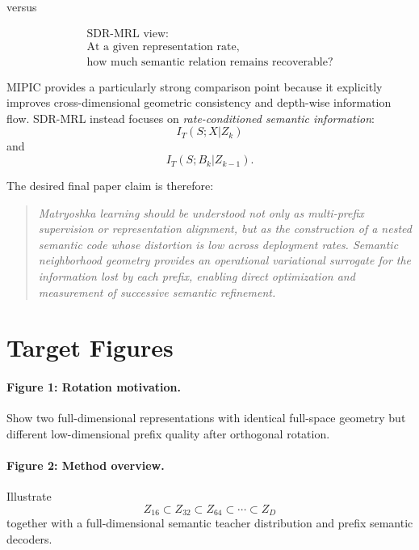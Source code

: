 \documentclass[11pt]{article}
\begin{document}
versus

\begin{equation}
\boxed{
\begin{array}{c}
\text{SDR-MRL view:}\\[2mm]
\text{At a given representation rate,}\\
\text{how much semantic relation remains recoverable?}
\end{array}
}
\end{equation}

MIPIC provides a particularly strong comparison point because it explicitly improves cross-dimensional geometric consistency and depth-wise information flow.
SDR-MRL instead focuses on \emph{rate-conditioned semantic information}:
\begin{equation}
    I_T(S;X|Z_k)
\end{equation}
and
\begin{equation}
    I_T(S;B_k|Z_{k-1}).
\end{equation}

The desired final paper claim is therefore:

\begin{quote}
\emph{
Matryoshka learning should be understood not only as multi-prefix supervision or representation alignment, but as the construction of a nested semantic code whose distortion is low across deployment rates.
Semantic neighborhood geometry provides an operational variational surrogate for the information lost by each prefix, enabling direct optimization and measurement of successive semantic refinement.
}
\end{quote}


\section{Target Figures}

\paragraph{Figure 1: Rotation motivation.}
Show two full-dimensional representations with identical full-space geometry but different low-dimensional prefix quality after orthogonal rotation.

\paragraph{Figure 2: Method overview.}
Illustrate
\begin{equation}
    Z_{16}
    \subset
    Z_{32}
    \subset
    Z_{64}
    \subset
    \cdots
    \subset
    Z_D
\end{equation}
together with a full-dimensional semantic teacher distribution and prefix semantic decoders.
\end{document}
